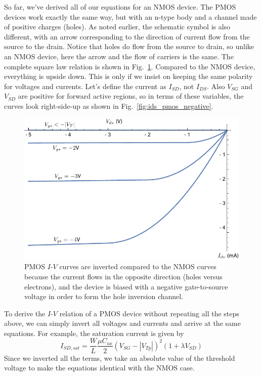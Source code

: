 So far, we’ve derived all of our equations for an NMOS device.  The  PMOS devices work exactly the same way, but with an n-type body and a channel made of positive charges (holes).  As noted earlier, the schematic symbol is also different, with an arrow corresponding to the direction of current flow from the source to the drain.  Notice that holes do flow from the source to drain, so unlike an NMOS device, here the arrow and the flow of carriers is the same.  The complete square law relation is shown in Fig.~\ref{fig:idspmos}.  Compared to the NMOS device, everything is upside down. This is only if we insist on keeping the same polarity for voltages and currents.  Let's define the current as $I_{SD}$, not $I_{DS}$.   Also $V_{SG}$ and $V_{SD}$ are positive for forward active regions, so in terms of these variables, the curves look right-side-up as shown in Fig.~\ref{fig:ids_pmos_negative}.


\begin{figure}[tb]
\begin{center}
\includegraphics[width=.75\columnwidth]{idspmos}
\end{center}
\caption{PMOS $I$-$V$ curves are inverted compared to the NMOS curves because the current flows in the opposite direction (holes versus electrons), and the device is biased with a negative gate-to-source voltage in order to form the hole inversion channel. } \label{fig:idspmos}
\end{figure}

To derive the $I$-$V$ relation of a PMOS device without repeating all the steps above, we can simply invert all voltages and currents and arrive at the same equations.  For example, the saturation current is given by
%
\begin{equation}
	{I_{SD,sat}} = \frac{W}{L}\frac{{\mu {C_{ox}}}}{2}{({V_{SG}} - {|V_{Tp}|})^2}(1 + \lambda {V_{SD}})
\end{equation}
%
Since we inverted all the terms, we take an absolute value of the threshold voltage to make the equations identical with the NMOS case.  


